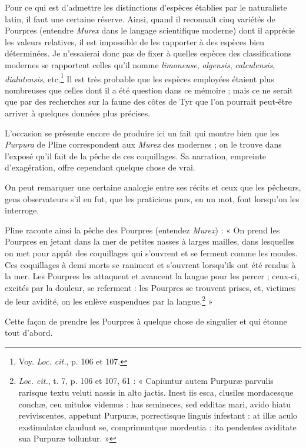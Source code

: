 \documentclass[a4paper, 11pt, oneside, polutonikogreek, french]{article}
\begin{document}
Pour ce qui est d'admettre les distinctions d'espèces établies par le naturaliste latin, il faut une certaine réserve. Ainsi, quand il reconnaît cinq variétés de Pourpres (entendre \emph{Murex} dans le langage scientifique moderne) dont il apprécie les valeurs relatives, il est impossible de les rapporter à des espèces bien déterminées. Je n'essaierai donc pas de fixer à quelles espèces des classifications modernes se rapportent celles qu'il nomme \emph{limoneuse}, \emph{algensis}, \emph{calculensis}, \emph{dialutensis}, etc.\footnote{Voy. \emph{Loc. cit.}, p. 106 et 107.} Il est très probable que les espèces employées étaient plus nombreuses que celles dont il a été question dans ce mémoire ; mais ce ne serait que par des recherches sur la faune des côtes de Tyr que l'on pourrait peut-être arriver à quelques données plus précises.

L'occasion se présente encore de produire ici un fait qui montre bien que les \emph{Purpura} de Pline correspondent aux \emph{Murex} des modernes ; on le trouve dans l'exposé qu'il fait de la pêche de ces coquillages. Sa narration, empreinte d'exagération, offre cependant quelque chose de vrai.

On peut remarquer une certaine analogie entre ses récits et ceux que les pêcheurs, gens observateurs s'il en fut, que les praticiens purs, en un mot, font lorsqu'on les interroge.

Pline raconte ainsi la pêche des Pourpres (entendez \emph{Murex}) : « On prend les Pourpres en jetant dans la mer de petites nasses à larges mailles, dans lesquelles on met pour appât des coquillages qui s'ouvrent et se ferment comme les moules. Ces coquillages à demi morts se raniment et s'ouvrent lorsqu'ils ont été rendus à la mer. Les Pourpres les attaquent et avancent la langue pour les percer ; ceux-ci, excités par la douleur, se referment : les Pourpres se trouvent prises, et, victimes de leur avidité, on les enlève suspendues par la langue.\footnote{\emph{Loc. cit.}, t. 7, p. 106 et 107, 61 : « Capiuntur autem Purpuræ parvulis rarisque textu veluti nassis in alto jactis. Inest iis esca, clusiles mordacesque conchæ, ceu mitulos videmus : has semineces, sed edditas mari, avido hiatu reviviscentes, appetunt Purpuræ, porrectisque linguis infestant : at illæ aculo exstimulatæ claudunt se, comprimuntque mordentia : ita pendentes aviditate sua Purpuræ tolluntur. »} »

Cette façon de prendre les Pourpres à quelque chose de singulier et qui étonne tout d'abord.
\end{document}
